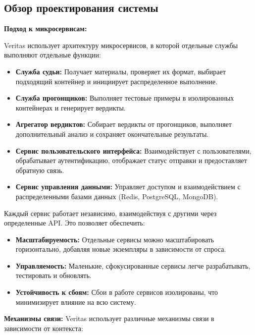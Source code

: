 \subsection{Обзор проектирования системы}

\textbf{Подход к микросервисам:}
\noindent

Veritas использует архитектуру микросервисов, в которой отдельные службы выполняют отдельные функции:
\noindent
\begin{itemize}
    \itemsep 0em
    \item \textbf{Служба судьи:} \noindent Получает материалы, проверяет их формат, выбирает подходящий контейнер и инициирует распределенное выполнение.
    \item \textbf{Служба прогонщиков:} \noindent Выполняет тестовые примеры в изолированных контейнерах и генерирует вердикты.
    \item \textbf{Агрегатор вердиктов:} \noindent Собирает вердикты от прогонщиков, выполняет дополнительный анализ и сохраняет окончательные результаты.
    \item \textbf{Сервис пользовательского интерфейса:} \noindent Взаимодействует с пользователями, обрабатывает аутентификацию, отображает статус отправки и предоставляет обратную связь.
    \item \textbf{Сервис управления данными:} \noindent Управляет доступом и взаимодействием с распределенными базами данных (Redis, PostgreSQL, MongoDB).
\end{itemize}

\noindent
Каждый сервис работает независимо, взаимодействуя с другими через определенные API. Это позволяет обеспечить:

\begin{itemize}
    \itemsep 0em
    \item \textbf{Масштабируемость:} \noindent Отдельные сервисы можно масштабировать горизонтально, добавляя новые экземпляры в зависимости от спроса.
    \item \textbf{Управляемость:} \noindent Маленькие, сфокусированные сервисы легче разрабатывать, тестировать и обновлять.
    \item \textbf{Устойчивость к сбоям:} \noindent Сбои в работе сервисов изолированы, что минимизирует влияние на всю систему.
\end{itemize}

\noindent
\textbf{Механизмы связи:} \noindent Veritas использует различные механизмы связи в зависимости от контекста:

